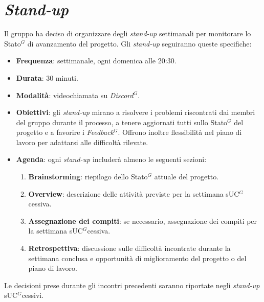 \section{\textit{Stand-up}}

Il gruppo ha deciso di organizzare degli \textit{stand-up} settimanali per
monitorare lo \gls{Stato}$^G$ di avanzamento del progetto. Gli \textit{stand-up}
seguiranno queste
specifiche:

\begin{itemize}
	\item \textbf{Frequenza}: settimanale, ogni domenica alle 20:30.

	\item \textbf{Durata}: 30 minuti.

	\item \textbf{Modalità}: videochiamata su \textit{\gls{Discord}$^G$}.

	\item \textbf{Obiettivi}: gli \textit{stand-up} mirano a risolvere i
	      problemi riscontrati dai membri del gruppo durante il processo, a tenere
	      aggiornati tutti sullo \gls{Stato}$^G$ del progetto e a favorire i
	      \textit{\gls{Feedback}$^G$}. Offrono inoltre flessibilità nel piano di lavoro per
	      adattarsi alle difficoltà rilevate.

	\item \textbf{Agenda}: ogni \textit{stand-up} includerà almeno le seguenti
	      sezioni:
	      \begin{enumerate}
		      \item \textbf{Brainstorming}: riepilogo dello \gls{Stato}$^G$ attuale del
		            progetto.

		      \item \textbf{Overview}: descrizione delle attività previste per
		            la settimana s\gls{UC}$^G$cessiva.

		      \item \textbf{Assegnazione dei compiti}: se necessario,
		            assegnazione dei compiti per la settimana s\gls{UC}$^G$cessiva.

		      \item \textbf{Retrospettiva}: discussione sulle difficoltà
		            incontrate durante la settimana conclusa e opportunità di
		            miglioramento del progetto o del piano di lavoro.
	      \end{enumerate}
\end{itemize}

Le decisioni prese durante gli incontri precedenti saranno riportate negli
\textit{stand-up} s\gls{UC}$^G$cessivi.

